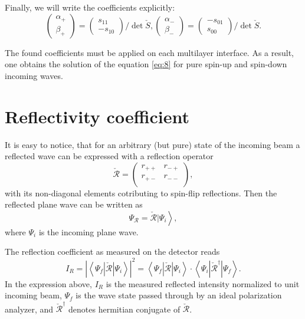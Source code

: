 \documentclass[12pt,a4paper]{article}
\begin{document}
Finally, we will write the coefficients explicitly:
\begin{equation}
\left(
\begin{matrix}
\alpha_{+} \\
\beta_{+}
\end{matrix}
\right)
=
\left(
\begin{matrix}
s_{11} \\
-s_{10}
\end{matrix}
\right) / \det{\check{S}},
\left(
\begin{matrix}
\alpha_{-} \\
\beta_{-}
\end{matrix}
\right)
=
\left(
\begin{matrix}
-s_{01} \\
s_{00}
\end{matrix}
\right) / \det{\check{S}}.
\end{equation}

The found coefficients must be applied on each multilayer interface. As a result, one obtains the solution of the equation \ref{eq:8} for pure spin-up and spin-down incoming waves.

\section{Reflectivity coefficient}

It is easy to notice, that for an arbitrary (but pure) state of the incoming beam a reflected wave can be expressed with a reflection operator
\begin{equation}
\check{\mathcal{R}}
=
\left(
\begin{matrix}
r_{++} & r_{-+} \\
r_{+-} & r_{--} \\
\end{matrix}
\right),
\end{equation}
with its non-diagonal elements cotributing to spin-flip reflections. Then the reflected plane wave can be written as
\begin{equation}
\Psi_{\mathcal{R}} = \left. \check{\mathcal{R}} | \Psi_i \right\rangle,
\end{equation}
where $\Psi_i$ is the incoming plane wave.

The reflection coefficient as measured on the detector reads
\begin{equation} \label{eq:29}
I_R
=
\left| \left\langle \Psi_f | \check{\mathcal{R}} | \Psi_i \right\rangle \right|^2
=
\left\langle \Psi_f | \check{\mathcal{R}} | \Psi_i \right\rangle
\cdot
\left\langle \Psi_i | \check{\mathcal{R}}^{\dagger} | \Psi_f \right\rangle.
\end{equation}
In the expression above, $I_R$ is the measured reflected intensity normalized to unit incoming beam, $\Psi_f$ is the wave state passed through by an ideal polarization analyzer, and $\check{\mathcal{R}}^{\dagger}$ denotes hermitian conjugate of $\check{\mathcal{R}}$.
\end{document}
